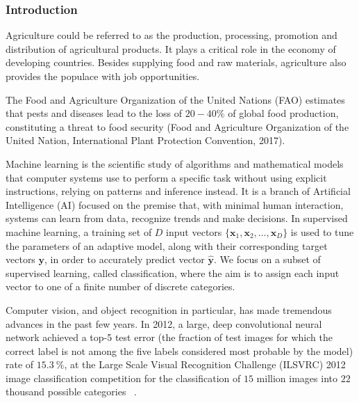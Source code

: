\documentclass{beamer}
\begin{document}
\begin{frame}[allowframebreaks]
\frametitle{Introduction}
Agriculture could be referred to as the production, processing, promotion and distribution of agricultural products. It plays a critical role in the economy of developing countries. Besides supplying food and raw materials, agriculture also provides the populace with job opportunities. 

The Food and Agriculture Organization of the United Nations (FAO) estimates that pests and diseases lead to the loss of $20 - 40 \%$ of global food production, constituting a threat to food security (Food and Agriculture Organization of the United Nation, International Plant Protection Convention, 2017). 

Machine learning is the scientific study of algorithms and mathematical models that computer systems use to perform a specific task without using explicit instructions, relying on patterns and inference instead. It is a branch of Artificial Intelligence (AI) focused on the premise that, with minimal human interaction, systems can learn from data, recognize trends and make decisions. In supervised machine learning, a training set of $D$ input  vectors $\{\bm{x}_1, \bm{x}_2, \hdots , \bm{x}_D\}$ is used to tune the parameters of an adaptive model, along with their corresponding target vectors $\bm{y}$, in order to accurately predict vector $\hat{\bm{y}}$. We focus on a subset of supervised learning, called classification, where the aim is to assign each input vector to one of a finite number of discrete categories.

Computer vision, and object recognition in particular, has made tremendous advances in the past few years. In 2012, a large, deep convolutional neural network achieved a top-5 test error (the fraction of test images for which the correct label is not among the five labels considered most probable by the model) rate of $15.3\ \%$, at the Large Scale Visual Recognition Challenge (ILSVRC) 2012 image classification competition for the classification of $15$ million images into $22$ thousand possible categories {~\cite{Krizhevsky}}. 
\end{frame}

\end{document}
